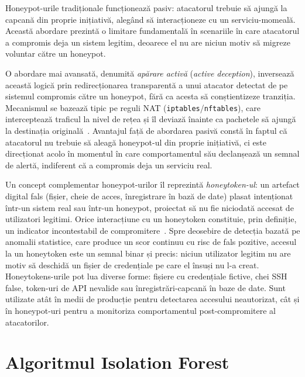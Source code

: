 Honeypot-urile tradiționale funcționează pasiv: atacatorul trebuie să ajungă la capcană din
proprie inițiativă, alegând să interacționeze cu un serviciu-momeală. Această abordare prezintă
o limitare fundamentală în scenariile în care atacatorul a compromis deja un sistem legitim,
deoarece el nu are niciun motiv să migreze voluntar către un honeypot.

O abordare mai avansată, denumită \textit{apărare activă} (\textit{active deception}), inversează
această logică prin redirecționarea transparentă a unui atacator detectat de pe sistemul compromis
către un honeypot, fără ca acesta să conștientizeze tranziția. Mecanismul se bazează tipic pe
reguli NAT (\texttt{iptables}/\texttt{nftables}), care interceptează traficul la nivel de rețea
și îl deviază înainte ca pachetele să ajungă la destinația originală~\cite{spitzner2002honeypots}.
Avantajul față de abordarea pasivă constă în faptul că atacatorul nu trebuie să aleagă
honeypot-ul din proprie inițiativă, ci este direcționat acolo în momentul în care comportamentul
său declanșează un semnal de alertă, indiferent că a compromis deja un serviciu real.

Un concept complementar honeypot-urilor îl reprezintă \textit{honeytoken-ul}: un artefact digital
fals (fișier, cheie de acces, înregistrare în bază de date) plasat intenționat într-un sistem
real sau într-un honeypot, proiectat să nu fie niciodată accesat de utilizatori legitimi. Orice
interacțiune cu un honeytoken constituie, prin definiție, un indicator incontestabil de
compromitere~\cite{spitzner2002honeypots}. Spre deosebire de detecția bazată pe anomalii
statistice, care produce un scor continuu cu risc de fals pozitive, accesul la un honeytoken
este un semnal binar și precis: niciun utilizator legitim nu are motiv să deschidă un fișier de
credențiale pe care el însuși nu l-a creat. Honeytokens-urile pot lua diverse forme: fișiere cu
credențiale fictive, chei SSH false, token-uri de API nevalide sau înregistrări-capcană în baze
de date. Sunt utilizate atât în medii de producție pentru detectarea accesului neautorizat,
cât și în honeypot-uri pentru a monitoriza comportamentul post-compromitere al atacatorilor.

\section{Algoritmul Isolation Forest}

